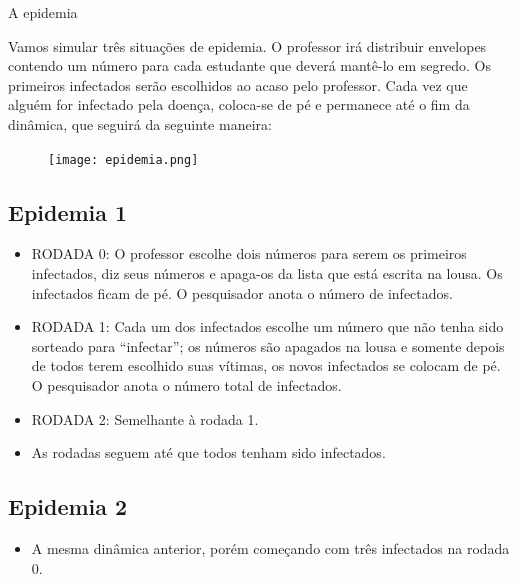 \begin{task}{A epidemia}


Vamos simular três situações de epidemia. O professor irá distribuir envelopes contendo um número para cada estudante que deverá mantê-lo em segredo. Os primeiros infectados serão escolhidos ao acaso pelo professor. Cada vez que alguém for infectado pela doença, coloca-se de pé e permanece até o fim da dinâmica, que seguirá da seguinte maneira:

\begin{figure}[H]
\centering
\texttt{[image: epidemia.png]}
\end{figure}


\subsection{Epidemia 1}

\begin{itemize}

\item RODADA 0: O professor escolhe dois números para serem os primeiros infectados, diz seus números e apaga-os da lista que está escrita na lousa. Os infectados ficam de pé. O pesquisador anota o número de infectados.

\item RODADA 1: Cada um dos infectados escolhe um número que não tenha sido sorteado para “infectar”; os números são apagados na lousa e somente depois de todos terem escolhido suas vítimas, os novos infectados se colocam de pé. O pesquisador anota o número total de infectados.

\item RODADA 2: Semelhante à rodada 1.

\item As rodadas seguem até que todos tenham sido infectados.

\end{itemize}

% 

\subsection{Epidemia 2}

\begin{itemize}

\item A mesma dinâmica anterior, porém começando com três infectados na rodada 0.


\end{itemize}
\end{task}

